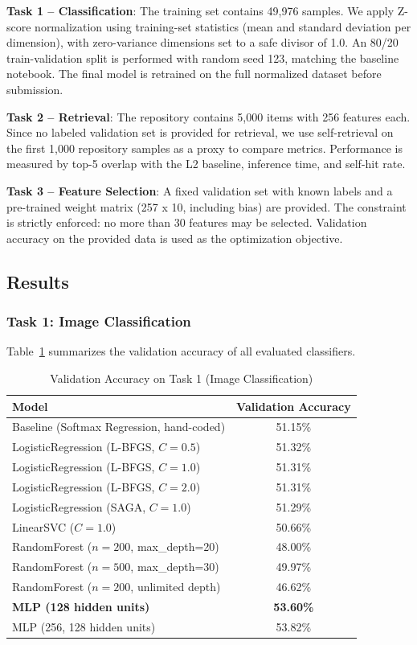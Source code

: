 \documentclass[onecolumn,a4paper,12pt]{IEEEtran}
\begin{document}
\textbf{Task 1 -- Classification}: The training set contains 49,976 samples. We apply Z-score normalization using training-set statistics (mean and standard deviation per dimension), with zero-variance dimensions set to a safe divisor of 1.0. An 80/20 train-validation split is performed with random seed 123, matching the baseline notebook. The final model is retrained on the full normalized dataset before submission.

\textbf{Task 2 -- Retrieval}: The repository contains 5,000 items with 256 features each. Since no labeled validation set is provided for retrieval, we use self-retrieval on the first 1,000 repository samples as a proxy to compare metrics. Performance is measured by top-5 overlap with the L2 baseline, inference time, and self-hit rate.

\textbf{Task 3 -- Feature Selection}: A fixed validation set with known labels and a pre-trained weight matrix (257 x 10, including bias) are provided. The constraint is strictly enforced: no more than 30 features may be selected. Validation accuracy on the provided data is used as the optimization objective.

\subsection{Results}

\subsubsection{Task 1: Image Classification}

Table~\ref{tab:task1} summarizes the validation accuracy of all evaluated classifiers.

\begin{table}[htbp]
\centering
\caption{Validation Accuracy on Task 1 (Image Classification)}
\label{tab:task1}
\begin{tabular}{lc}
\toprule
\textbf{Model} & \textbf{Validation Accuracy} \\
\midrule
Baseline (Softmax Regression, hand-coded) & 51.15\% \\
LogisticRegression (L-BFGS, $C=0.5$) & 51.32\% \\
LogisticRegression (L-BFGS, $C=1.0$) & 51.31\% \\
LogisticRegression (L-BFGS, $C=2.0$) & 51.31\% \\
LogisticRegression (SAGA, $C=1.0$) & 51.29\% \\
LinearSVC ($C=1.0$) & 50.66\% \\
RandomForest ($n=200$, max\_depth=20) & 48.00\% \\
RandomForest ($n=500$, max\_depth=30) & 49.97\% \\
RandomForest ($n=200$, unlimited depth) & 46.62\% \\
\textbf{MLP (128 hidden units)} & \textbf{53.60\%} \\
MLP (256, 128 hidden units) & 53.82\% \\
\bottomrule
\end{tabular}
\end{table}
\end{document}
